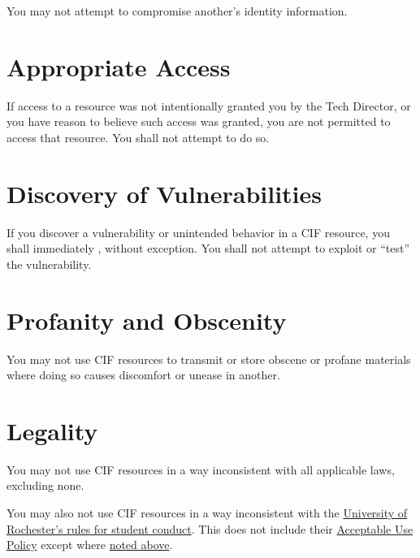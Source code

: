 \documentclass[12pt]{article}
\newcommand{\rochesterAUP}[1]{\href{http://www.resnet.rochester.edu/getstarted/aup.php}{#1}}
\begin{document}
You may not attempt to compromise another's identity information.


\section{Appropriate Access} %

If access to a resource was not intentionally granted you by the Tech Director, or you have reason to believe such access was granted, you are not permitted to access that resource. You shall not attempt to do so.


\section{Discovery of Vulnerabilities} %

If you discover a vulnerability or unintended behavior in a CIF resource, you shall immediately , without exception. You shall not attempt to exploit or ``test'' the vulnerability.


\section{Profanity and Obscenity} %

You may not use CIF resources to transmit or store obscene or profane materials where doing so causes discomfort or unease in another.


\section{Legality} %

You may not use CIF resources in a way inconsistent with all applicable laws, excluding none.

You may also not use CIF resources in a way inconsistent with the \href{http://www.rochester.edu/college/odos/conduct/}{University of Rochester's rules for student conduct}. This does not include their \rochesterAUP{Acceptable Use Policy} except where \hyperref[sec:rochester-aup]{noted above}.

\end{document}
